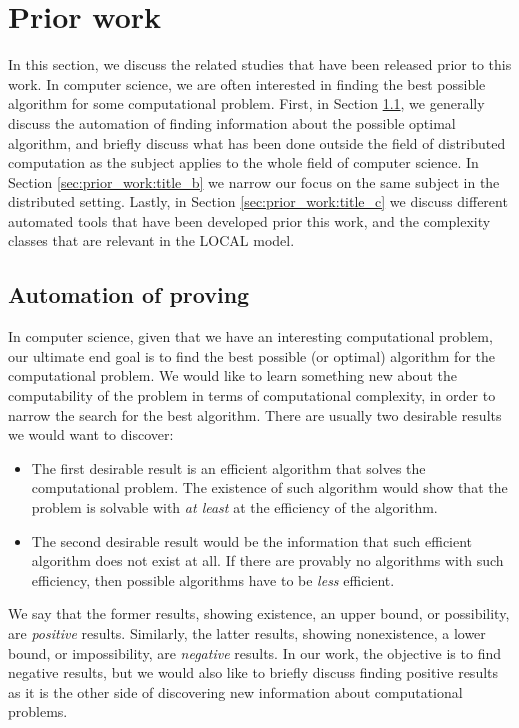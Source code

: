 
\section{Prior work} \label{sec:prior_work}
In this section, we discuss the related studies that have been released prior to this work.
In computer science, we are often interested in finding the best possible algorithm for some computational problem.
First, in Section \ref{sec:prior_work:title_a}, we generally discuss the automation of finding information about the possible optimal algorithm, and briefly discuss what has been done outside the field of distributed computation as the subject applies to the whole field of computer science.
In Section \ref{sec:prior_work:title_b} we narrow our focus on the same subject in the distributed setting.
Lastly, in Section \ref{sec:prior_work:title_c} we discuss different automated tools that have been developed prior this work, and the complexity classes that are relevant in the LOCAL model.

\subsection{Automation of proving} \label{sec:prior_work:title_a} %
In computer science, given that we have an interesting computational problem, our ultimate end goal is to find the best possible (or optimal) algorithm for the computational problem.
We would like to learn something new about the computability of the problem in terms of computational complexity, in order to narrow the search for the best algorithm.
There are usually two desirable results we would want to discover:
\begin{itemize}
    \item
    The first desirable result is an efficient algorithm that solves the computational problem.
    The existence of such algorithm would show that the problem is solvable with \emph{at least} at the efficiency of the algorithm.
    \item
    The second desirable result would be the information that such efficient algorithm does not exist at all.
    If there are provably no algorithms with such efficiency, then possible algorithms have to be \emph{less} efficient.
\end{itemize}
We say that the former results, showing existence, an upper bound, or possibility, are \emph{positive} results.
Similarly, the latter results, showing nonexistence, a lower bound, or impossibility, are \emph{negative} results.
In our work, the objective is to find negative results, but we would also like to briefly discuss finding positive results as it is the other side of discovering new information about computational problems.

